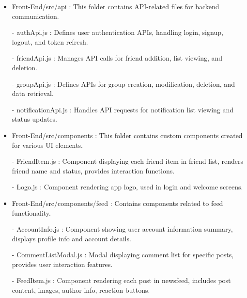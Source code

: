 \documentclass[conference]{IEEEtran}
\begin{document}
\begin{itemize}
                    \item Front-End/src/api : This folder contains API-related files for backend communication.
                        \item[-] authApi.js : Defines user authentication APIs, handling login, signup, logout, and token refresh.
                        \item[-] friendApi.js : Manages API calls for friend addition, list viewing, and deletion.
                        \item[-] groupApi.js : Defines APIs for group creation, modification, deletion, and data retrieval.
                        \item[-] notificationApi.js : Handles API requests for notification list viewing and status updates.
                    \vspace{3mm}
                    
                    \item Front-End/src/components : This folder contains custom components created for various UI elements.
                        \item[-] FriendItem.js : Component displaying each friend item in friend list, renders friend name and status, provides interaction functions.
                        \item[-] Logo.js : Component rendering app logo, used in login and welcome screens.
                    \vspace{3mm}
                    
                    \item Front-End/src/components/feed : Contains components related to feed functionality.
                        \item[-] AccountInfo.js : Component showing user account information summary, displays profile info and account details.
                        \item[-] CommentListModal.js : Modal displaying comment list for specific posts, provides user interaction features.
                        \item[-] FeedItem.js : Component rendering each post in newsfeed, includes post content, images, author info, reaction buttons.
                    \vspace{3mm}
                    

\end{itemize}
\end{document}

